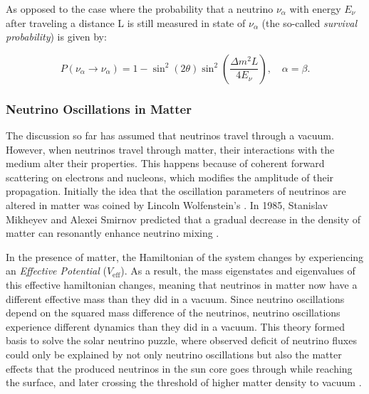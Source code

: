 As opposed to the case where the probability that a neutrino $\nu_{\alpha}$ with energy $E_{\nu}$ after traveling a distance L is still measured in state of $\nu_{\alpha}$ (the so-called \emph{survival probability}) is given by:

\begin{equation}\label{eq:twoflavour_survival}
        P(\nu_\alpha \rightarrow \nu_\alpha) = 1-\sin^2(2\theta) \sin^2\left(\frac{\Delta m^2 L}{4 E_\nu}\right), \quad \alpha = \beta.
\end{equation}

\subsubsection*{Neutrino Oscillations in Matter}
\label{sec:nu_osc_matter}
The discussion so far has assumed that neutrinos travel through a vacuum. However, when neutrinos travel through matter, their interactions with the medium alter their properties. This happens because of coherent forward scattering on electrons and nucleons, which modifies the amplitude of their propagation. Initially the idea that the oscillation parameters of neutrinos are altered in matter was coined by Lincoln Wolfenstein's . In 1985, Stanislav Mikheyev and Alexei Smirnov predicted that a gradual decrease in the density of matter can resonantly enhance neutrino mixing . 

In the presence of matter, the Hamiltonian of the system changes by experiencing an \emph{Effective Potential} ($V_{\mathrm{eff}}$). As a result, the mass eigenstates and eigenvalues of  this effective hamiltonian changes, meaning that neutrinos in matter now have a different effective mass than they did in a vacuum. Since neutrino oscillations depend on the squared mass difference of the neutrinos, neutrino oscillations experience different dynamics than they did in a vacuum. This theory formed basis to solve the solar neutrino puzzle, where observed deficit of neutrino fluxes could only be explained by not only neutrino oscillations but also the matter effects that the produced neutrinos in the sun core goes through while reaching the surface, and later crossing the threshold of higher matter density to vacuum . 

